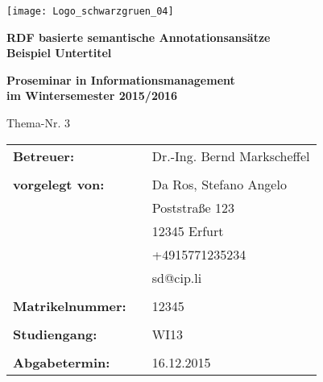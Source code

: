\documentclass[float=false, crop=false]{standalone}
\begin{document}
\begin{titlepage}
\begin{minipage}{1\textwidth}
\flushright 
   \texttt{[image: Logo\_schwarzgruen\_04]}
\end{minipage}

\vspace{3cm}
\begin{center}
\textbf{\LARGE{RDF basierte semantische Annotationsansätze}}
\\
\textbf{Beispiel Untertitel}
\end{center}
\vspace{1.5cm}

\begin{center}
\textbf{Proseminar in Informationsmanagement\\ im Wintersemester 2015/2016}
\end{center}

\vspace{0.5cm}
\begin{center}
	Thema-Nr. 3
\end{center}

\vspace{2cm}

\begin{flushleft}
\begin{tabular}{lll}
\textbf{Betreuer:} & &  Dr.-Ing. Bernd Markscheffel\\
& & \\
\textbf{vorgelegt von:}& & Da Ros, Stefano Angelo\\
& & Poststraße 123\\
& & 12345 Erfurt\\
& & +4915771235234\\
& & sd@cip.li\\
& & \\
\textbf{Matrikelnummer:} & & 12345\\
& & \\

\textbf{Studiengang:} & & WI13\\
& & \\

\textbf{Abgabetermin:} & & 16.12.2015
\end{tabular}
\end{flushleft}
\end{titlepage}
\end{document}
